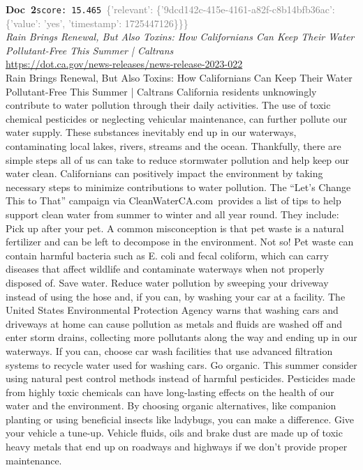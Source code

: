 \documentclass[a4paper,11pt]{article}
\begin{document}
\begin{docenv}
{\footnotesize\textcolor{doccolor}{\textbf{Doc~2}}}\hfill{\tiny\texttt{score:~15.465}}\ {\tiny\textcolor{gray}{\{'relevant': \{'9dcd142c-415e-4161-a82f-c8b14bfb36ac': \{'value': 'yes', 'timestamp': 1725447126\}\}\}}}\\[3pt]
{\small\textit{Rain Brings Renewal, But Also Toxins: How Californians Can Keep Their Water Pollutant-Free This Summer | Caltrans}}\\[2pt]
{\tiny\url{https://dot.ca.gov/news-releases/news-release-2023-022}}\\[4pt]
{\footnotesize Rain Brings Renewal, But Also Toxins: How Californians Can Keep Their Water Pollutant-Free This Summer | Caltrans
California residents unknowingly contribute to water pollution through their daily activities. The use of toxic chemical pesticides or neglecting vehicular maintenance, can further pollute our water supply. These substances inevitably end up in our waterways, contaminating local lakes, rivers, streams and the ocean. Thankfully, there are simple steps all of us can take to reduce stormwater pollution and help keep our water clean.
Californians can positively impact the environment by taking necessary steps to minimize contributions to water pollution. The “Let’s Change This to That” campaign via CleanWaterCA.com provides a list of tips to help support clean water from summer to winter and all year round. They include:
Pick up after your pet. A common misconception is that pet waste is a natural fertilizer and can be left to decompose in the environment. Not so! Pet waste can contain harmful bacteria such as E. coli and fecal coliform, which can carry diseases that affect wildlife and contaminate waterways when not properly disposed of.
Save water. Reduce water pollution by sweeping your driveway instead of using the hose and, if you can, by washing your car at a facility. The United States Environmental Protection Agency warns that washing cars and driveways at home can cause pollution as metals and fluids are washed off and enter storm drains, collecting more pollutants along the way and ending up in our waterways. If you can, choose car wash facilities that use advanced filtration systems to recycle water used for washing cars.
Go organic. This summer consider using natural pest control methods instead of harmful pesticides. Pesticides made from highly toxic chemicals can have long-lasting effects on the health of our water and the environment. By choosing organic alternatives, like companion planting or using beneficial insects like ladybugs, you can make a difference.
Give your vehicle a tune-up. Vehicle fluids, oils and brake dust are made up of toxic heavy metals that end up on roadways and highways if we don’t provide proper maintenance.}
\end{docenv}
\end{document}
